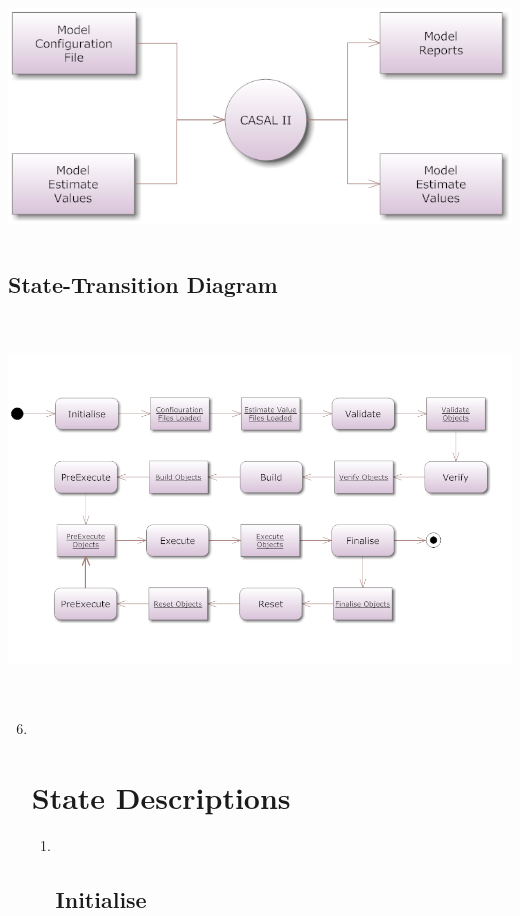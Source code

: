 \documentclass[a4paper,11pt,twoside,pdftex,draft]{article}
\begin{document}
\includegraphics[width=6.0in,height=2.5in]{images/input_output.png}

\hypertarget{state-transition-diagram}{%
\subsection{State-Transition Diagram}\label{state-transition-diagram}}

\includegraphics[width=6.0in,height=4.0in]{images/state_flow.png}

\begin{enumerate}
\setcounter{enumi}{5}
\item ~
  \hypertarget{state-descriptions}{%
  \section{State Descriptions}\label{state-descriptions}}

  \begin{enumerate}
  \item ~
    \hypertarget{initialise}{%
    \subsection{Initialise}\label{initialise}}
  \end{enumerate}
\end{enumerate}
\end{document}
